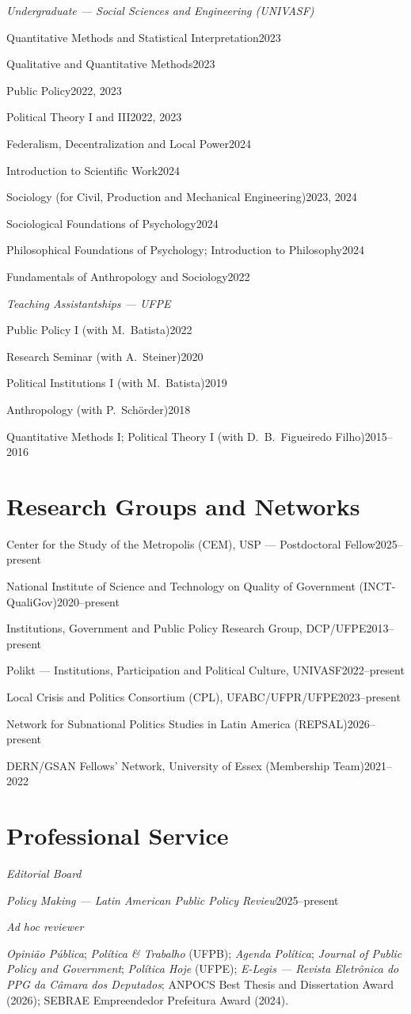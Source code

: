 \documentclass[11pt]{article}
\newcommand{\cvsubsection}[1]{\vspace{0.9em}\textit{#1}\par\vspace{0.35em}}
\newcommand{\entryplain}[2]{\noindent#1\hfill #2\par\vspace{0.15em}}
\begin{document}
\vspace{0.9em}
\cvsubsection{Undergraduate --- Social Sciences and Engineering (UNIVASF)}
\entryplain{Quantitative Methods and Statistical Interpretation}{2023}
\entryplain{Qualitative and Quantitative Methods}{2023}
\entryplain{Public Policy}{2022, 2023}
\entryplain{Political Theory I and III}{2022, 2023}
\entryplain{Federalism, Decentralization and Local Power}{2024}
\entryplain{Introduction to Scientific Work}{2024}
\entryplain{Sociology (for Civil, Production and Mechanical Engineering)}{2023, 2024}
\entryplain{Sociological Foundations of Psychology}{2024}
\entryplain{Philosophical Foundations of Psychology; Introduction to Philosophy}{2024}
\entryplain{Fundamentals of Anthropology and Sociology}{2022}

\vspace{0.9em}
\cvsubsection{Teaching Assistantships --- UFPE}
\entryplain{Public Policy I (with M.\ Batista)}{2022}
\entryplain{Research Seminar (with A.\ Steiner)}{2020}
\entryplain{Political Institutions I (with M.\ Batista)}{2019}
\entryplain{Anthropology (with P.\ Schörder)}{2018}
\entryplain{Quantitative Methods I; Political Theory I (with D.\ B.\ Figueiredo Filho)}{2015--2016}

\section{Research Groups and Networks}

\entryplain{Center for the Study of the Metropolis (CEM), USP --- Postdoctoral Fellow}{2025--present}
\entryplain{National Institute of Science and Technology on Quality of Government (INCT-QualiGov)}{2020--present}
\entryplain{Institutions, Government and Public Policy Research Group, DCP/UFPE}{2013--present}
\entryplain{Polikt --- Institutions, Participation and Political Culture, UNIVASF}{2022--present}
\entryplain{Local Crisis and Politics Consortium (CPL), UFABC/UFPR/UFPE}{2023--present}
\entryplain{Network for Subnational Politics Studies in Latin America (REPSAL)}{2026--present}
\entryplain{DERN/GSAN Fellows' Network, University of Essex (Membership Team)}{2021--2022}

\section{Professional Service}
\cvsubsection{Editorial Board}
\entryplain{\textit{Policy Making --- Latin American Public Policy Review}}{2025--present}

\vspace{0.9em}
\cvsubsection{Ad hoc reviewer}
\textit{Opinião Pública}; \textit{Política \& Trabalho} (UFPB); \textit{Agenda Política}; \textit{Journal of Public Policy and Government}; \textit{Política Hoje} (UFPE); \textit{E-Legis --- Revista Eletrônica do PPG da Câmara dos Deputados}; ANPOCS Best Thesis and Dissertation Award (2026); SEBRAE Empreendedor Prefeitura Award (2024).
\end{document}
